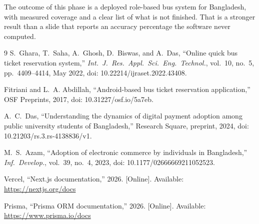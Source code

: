 \documentclass[12pt,a4paper]{report}
\begin{document}
The outcome of this phase is a deployed role-based bus system for Bangladesh, with measured coverage and a clear list of what is not finished. That is a stronger result than a slide that reports an accuracy percentage the software never computed.

\begin{thebibliography}{9}
S.~Ghara, T.~Saha, A.~Ghosh, D.~Biswas, and A.~Das, ``Online quick bus ticket reservation system,'' \emph{Int.\ J.\ Res.\ Appl.\ Sci.\ Eng.\ Technol.}, vol.~10, no.~5, pp.~4409--4414, May 2022, doi: 10.22214/ijraset.2022.43408.

Fitriani and L.~A. Abdillah, ``Android-based bus ticket reservation application,'' OSF Preprints, 2017, doi: 10.31227/osf.io/5a7eb.

A.~C.~Das, ``Understanding the dynamics of digital payment adoption among public university students of Bangladesh,'' Research Square, preprint, 2024, doi: 10.21203/rs.3.rs-4138836/v1.

M.~S.~Azam, ``Adoption of electronic commerce by individuals in Bangladesh,'' \emph{Inf.\ Develop.}, vol.~39, no.~4, 2023, doi: 10.1177/02666669211052523.

Vercel, ``Next.js documentation,'' 2026. [Online]. Available: \url{https://nextjs.org/docs}

Prisma, ``Prisma ORM documentation,'' 2026. [Online]. Available: \url{https://www.prisma.io/docs}

\end{thebibliography}
\end{document}
